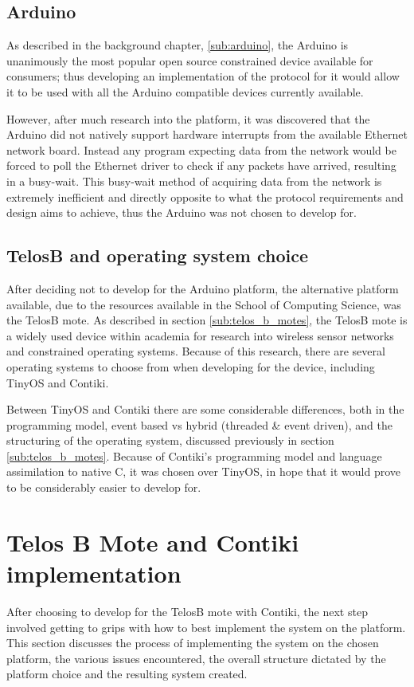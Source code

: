 \subsection{Arduino} %
\label{sec:arduino}
As described in the background chapter, \ref{sub:arduino}, the Arduino is unanimously the most popular open source constrained device available for consumers; thus developing an implementation of the protocol for it would allow it to be used with all the Arduino compatible devices currently available.

However, after much research into the platform, it was discovered that the Arduino did not natively support hardware interrupts from the available Ethernet network board.\cite{ArduinoEthernet} Instead any program expecting data from the network would be forced to poll the Ethernet driver to check if any packets have arrived, resulting in a busy-wait. This busy-wait method of acquiring data from the network is extremely inefficient and directly opposite to what the protocol requirements and design aims to achieve, thus the Arduino was not chosen to develop for.

\subsection{TelosB and operating system choice}
After deciding not to develop for the Arduino platform, the alternative platform available, due to the resources available in the School of Computing Science, was the TelosB mote. As described in section \ref{sub:telos_b_motes}, the TelosB mote is a widely used device within academia for research into wireless sensor networks and constrained operating systems. Because of this research, there are several operating systems to choose from when developing for the device, including TinyOS and Contiki.

Between TinyOS and Contiki there are some considerable differences, both in the programming model, event based vs hybrid (threaded \& event driven), and the structuring of the operating system, discussed previously in section \ref{sub:telos_b_motes}. Because of Contiki's programming model and language assimilation to native C, it was chosen over TinyOS, in hope that it would prove to be considerably easier to develop for.


\section{Telos B Mote and Contiki implementation} %
\label{sec:contiki}
After choosing to develop for the TelosB mote with Contiki, the next step involved getting to grips with how to best implement the system on the platform. This section discusses the process of implementing the system on the chosen platform, the various issues encountered, the overall structure dictated by the platform choice and the resulting system created. 

